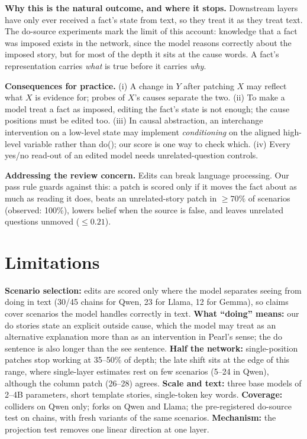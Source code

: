 \documentclass[conference]{IEEEtran}
\begin{document}
\textbf{Why this is the natural outcome, and where it stops.} Downstream layers have only ever received a fact's state from text, so they treat it as they treat text. The do-source experiments mark the limit of this account: knowledge that a fact was imposed exists in the network, since the model reasons correctly about the imposed story, but for most of the depth it sits at the cause words. A fact's representation carries \emph{what} is true before it carries \emph{why}.

\textbf{Consequences for practice.} (i) A change in $Y$ after patching $X$ may reflect what $X$ is evidence for; probes of $X$'s causes separate the two. (ii) To make a model treat a fact as imposed, editing the fact's state is not enough; the cause positions must be edited too. (iii) In causal abstraction, an interchange intervention on a low-level state may implement \emph{conditioning} on the aligned high-level variable rather than do(); our score is one way to check which. (iv) Every yes/no read-out of an edited model needs unrelated-question controls.

\textbf{Addressing the review concern.} Edits can break language processing. Our pass rule guards against this: a patch is scored only if it moves the fact about as much as reading it does, beats an unrelated-story patch in $\ge70\%$ of scenarios (observed: 100\%), lowers belief when the source is false, and leaves unrelated questions unmoved ($\le0.21$).

\section{Limitations}
\textbf{Scenario selection:} edits are scored only where the model separates seeing from doing in text (30/45 chains for Qwen, 23 for Llama, 12 for Gemma), so claims cover scenarios the model handles correctly in text. \textbf{What ``doing'' means:} our do stories state an explicit outside cause, which the model may treat as an alternative explanation more than as an intervention in Pearl's sense; the do sentence is also longer than the see sentence. \textbf{Half the network:} single-position patches stop working at 35--50\% of depth; the late shift sits at the edge of this range, where single-layer estimates rest on few scenarios (5--24 in Qwen), although the column patch (26--28) agrees. \textbf{Scale and text:} three base models of 2--4B parameters, short template stories, single-token key words. \textbf{Coverage:} colliders on Qwen only; forks on Qwen and Llama; the pre-registered do-source test on chains, with fresh variants of the same scenarios. \textbf{Mechanism:} the projection test removes one linear direction at one layer.
\end{document}
